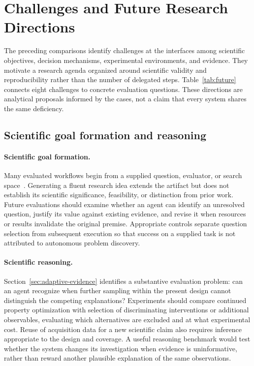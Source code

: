\section{Challenges and Future Research Directions}
\label{sec:future}

The preceding comparisons identify challenges at the interfaces among scientific objectives, decision mechanisms, experimental environments, and evidence. They motivate a research agenda organized around scientific validity and reproducibility rather than the number of delegated steps. Table~\ref{tab:future} connects eight challenges to concrete evaluation questions. These directions are analytical proposals informed by the cases, not a claim that every system shares the same deficiency.

\subsection{Scientific goal formation and reasoning}

\paragraph{Scientific goal formation.}
Many evaluated workflows begin from a supplied question, evaluator, or search space~\cite{asd0018,asd0512,burger2020}. Generating a fluent research idea extends the artifact but does not establish its scientific significance, feasibility, or distinction from prior work. Future evaluations should examine whether an agent can identify an unresolved question, justify its value against existing evidence, and revise it when resources or results invalidate the original premise. Appropriate controls separate question selection from subsequent execution so that success on a supplied task is not attributed to autonomous problem discovery.

\paragraph{Scientific reasoning.}
Section~\ref{sec:adaptive-evidence} identifies a substantive evaluation problem: can an agent recognize when further sampling within the present design cannot distinguish the competing explanations? Experiments should compare continued property optimization with selection of discriminating interventions or additional observables, evaluating which alternatives are excluded and at what experimental cost. Reuse of acquisition data for a new scientific claim also requires inference appropriate to the design and coverage. A useful reasoning benchmark would test whether the system changes its investigation when evidence is uninformative, rather than reward another plausible explanation of the same observations.

